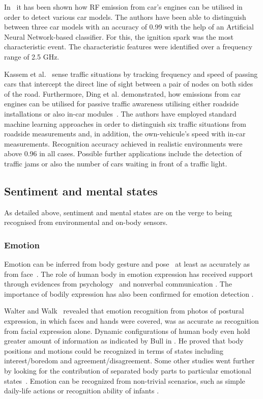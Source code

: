 \documentclass[journal]{IEEEtran}
\begin{document}
\begin{figure*}
In~\cite{RFSensing_Dong_2006} it has been shown how RF emission from car's engines can be utilised in order to detect various car models.
The authors have been able to distinguish between three car models with an accuracy of 0.99 with the help of an Artificial Neural Network-based classifier.
For this, the ignition spark was the most characteristic event.
The characteristic features were identified over a frequency range of 2.5 GHz.

Kassem et al.~\cite{RFSensing_Kassem_2012} sense traffic situations by tracking frequency and speed of passing cars that intercept the direct line of sight between a pair of nodes on both sides of the road. 
Furthermore, Ding et al. demonstrated, how emissions from car engines can be utilised for passive traffic awareness utilising either roadside installations or also in-car modules~\cite{RFSensing_Ding_2011,RFSensing_Ding_2012}.
The authors have employed standard machine learning approaches in order to distinguish six traffic situations from roadside measurements and, in addition, the own-vehicule's speed with in-car measurements.
Recognition accuracy achieved in realistic environments were above 0.96 in all cases.
Possible further applications include the detection of traffic jams or also the number of cars waiting in front of a traffic light. 

\subsection{Sentiment and mental states}
As detailed above, sentiment and mental states are on the verge to being recognised from environmental and on-body sensors.
\subsubsection{Emotion}
Emotion can be inferred from body gesture and pose~\cite{Pervasive_Jaggarwal_2012} at least as accurately as from face~\cite{Emotion_Nguyen_2012,Emotion_Castellano_2008,Emotion_Meeren_2005}.
The role of human body in emotion expression has received support through evidences from psychology~\cite{Emotion_Walters_1986} and nonverbal communication \cite{Emotion_Dittmann_1978}. 
The importance of  bodily expression has also been confirmed for emotion detection \cite{Emotion_Wallbott_1998, Emotion_VanHeijnsbergen_2007,Emotion_Atkinson_2007}. 


Walter and Walk~\cite{Emotion_Walters_1986} revealed that emotion recognition from photos of postural expression, in which faces and hands were covered, was as accurate as recognition from facial expression alone.
Dynamic configurations of human body even hold greater amount of information as indicated by Bull in \cite{Emotion_Bull_1987}. 
He proved that body positions and motions could be recognized in terms of states including interest/boredom and agreement/disagreement. 
Some other studies went further by looking for the contribution of separated body parts to particular emotional states~\cite{Emotion_DeMeijer_1989,Emotion_Montepare_1999}.
Emotion can be recognized from non-trivial scenarios, such as simple daily-life actions \cite{Emotion_Crane_2007,Emotion_Bernhardt_2007} or recognition ability of infants \cite{Emotion_Lagerlof_2009}. 



\end{figure*}
\end{document}
